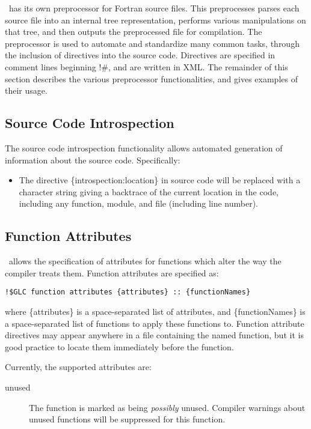 \glc\ has its own preprocessor for Fortran source files. This preprocesses parses each source file into an internal tree representation, performs various manipulations on that tree, and then outputs the preprocessed file for compilation. The preprocessor is used to automate and standardize many common tasks, through the inclusion of directives into the source code. Directives are specified in comment lines beginning {\normalfont \ttfamily !\#}, and are written in XML. The remainder of this section describes the various preprocessor functionalities, and gives examples of their usage.

\subsection{Source Code Introspection}

The source code introspection functionality allows automated generation of information about the source code. Specifically:
\begin{itemize}
\item The directive {\normalfont \ttfamily \{introspection:location\}} in source code will be replaced with a character string giving a backtrace of the current location in the code, including any function, module, and file (including line number).
\end{itemize}

\subsection{Function Attributes}

\glc\ allows the specification of attributes for functions which alter the way the compiler treats them. Function attributes are specified as:
\begin{verbatim}
!$GLC function attributes {attributes} :: {functionNames}
\end{verbatim}
where {\normalfont \ttfamily \{attributes\}} is a space-separated list of attributes, and {\normalfont \ttfamily \{functionNames\}} is a space-separated list of functions to apply these functions to. Function attribute directives may appear anywhere in a file containing the named function, but it is good practice to locate them immediately before the function.

Currently, the supported attributes are:
\begin{description}
\item[{\normalfont \ttfamily unused}] The function is marked as being \emph{possibly} unused. Compiler warnings about unused functions will be suppressed for this function.
\end{description}

